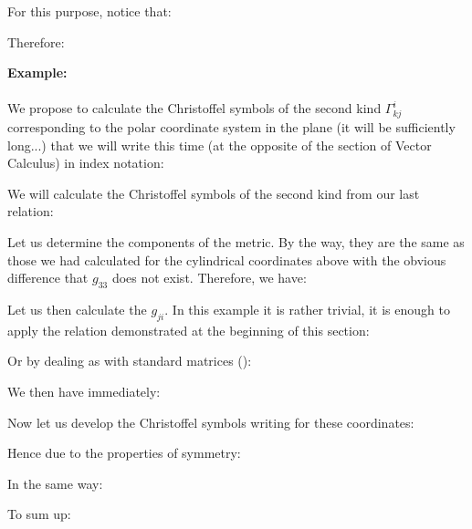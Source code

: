 	For this purpose, notice that:
	
	Therefore:
	

	\pagebreak
	\begin{tcolorbox}[colframe=black,colback=white,sharp corners]
	\textbf{{\Large {}}Example:}\\\\
	We propose to calculate the Christoffel symbols of the second kind $\Gamma_{kj}^i$ corresponding to the polar coordinate system in the plane  (it will be sufficiently long...) that we will write this time (at the opposite of the section of Vector Calculus) in index notation:
	
	We will calculate the Christoffel symbols of the second kind from our last relation:
	
	Let us determine the components of the metric. By the way, they are the same as those we had calculated for the cylindrical coordinates above with the obvious difference that $g_{33}$ does not exist. Therefore, we have:
	
	Let us then calculate the $g_{ji}$. In this example it is rather trivial, it is enough to apply the relation demonstrated at the beginning of this section:
	
	Or by dealing as with standard matrices ():
	
	We then have immediately:
	
	Now let us develop the Christoffel symbols writing for these coordinates:
	\end{tcolorbox}
	
	
	\begin{tcolorbox}[colframe=black,colback=white,sharp corners]
	
	Hence due to the properties of symmetry:
	
	In the same way:
	
	\end{tcolorbox}
	
	
	\begin{tcolorbox}[colframe=black,colback=white,sharp corners]
	To sum up:
	
	\end{tcolorbox}
	
